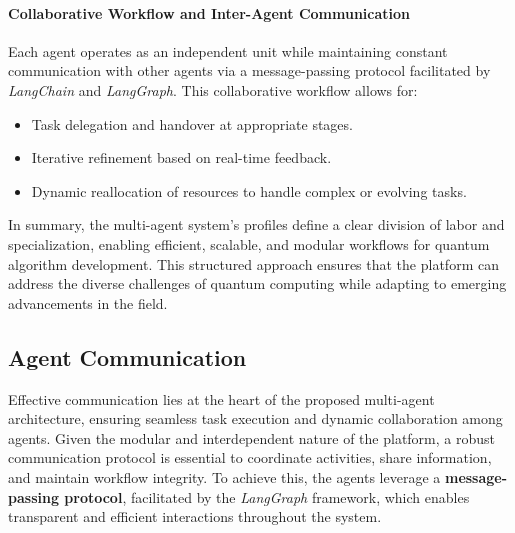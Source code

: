 \documentclass[12pt]{article}
\begin{document}
\paragraph{Collaborative Workflow and Inter-Agent Communication}
Each agent operates as an independent unit while maintaining constant communication with other agents via a message-passing protocol facilitated by \textit{LangChain} and \textit{LangGraph}. This collaborative workflow allows for:
\begin{itemize}
    \item Task delegation and handover at appropriate stages.
    \item Iterative refinement based on real-time feedback.
    \item Dynamic reallocation of resources to handle complex or evolving tasks.
\end{itemize}

In summary, the multi-agent system's profiles define a clear division of labor and specialization, enabling efficient, scalable, and modular workflows for quantum algorithm development. This structured approach ensures that the platform can address the diverse challenges of quantum computing while adapting to emerging advancements in the field.


\subsection{Agent Communication}
Effective communication lies at the heart of the proposed multi-agent architecture, ensuring seamless task execution and dynamic collaboration among agents. Given the modular and interdependent nature of the platform, a robust communication protocol is essential to coordinate activities, share information, and maintain workflow integrity. To achieve this, the agents leverage a \textbf{message-passing protocol}, facilitated by the \textit{LangGraph} framework, which enables transparent and efficient interactions throughout the system.
\end{document}
